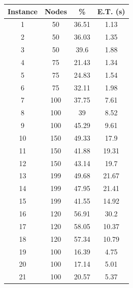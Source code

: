 \documentclass[10pt,twoside]{article}
\begin{document}
\begin{table}
\parbox{.45\linewidth}{
\centering
\begin{tabular}{cccc}
\hline
\textbf{Instance} & \textbf{Nodes} & \textbf{\%} & \textbf{E.T. (s)} \\ \hline
1                 & 50             & 36.51       & 1.13              \\
2                 & 50             & 36.03       & 1.35              \\
3                 & 50             & 39.6        & 1.88              \\
4                 & 75             & 21.43       & 1.34              \\
5                 & 75             & 24.83       & 1.54              \\
6                 & 75             & 32.11       & 1.98              \\
7                 & 100            & 37.75       & 7.61              \\
8                 & 100            & 39          & 8.52              \\
9                 & 100            & 45.29       & 9.61              \\
10                & 150            & 49.33       & 17.9              \\
11                & 150            & 41.88       & 19.31             \\
12                & 150            & 43.14       & 19.7              \\
13                & 199            & 49.68       & 21.67             \\
14                & 199            & 47.95       & 21.41             \\
15                & 199            & 41.55       & 14.92             \\
16                & 120            & 56.91       & 30.2              \\
17                & 120            & 58.05       & 10.37             \\
18                & 120            & 57.34       & 10.79             \\
19                & 100            & 16.39       & 4.75              \\
20                & 100            & 17.14       & 5.01              \\
21                & 100            & 20.57       & 5.37              \\ \hline

\end{tabular}}
\end{table}
\end{document}
